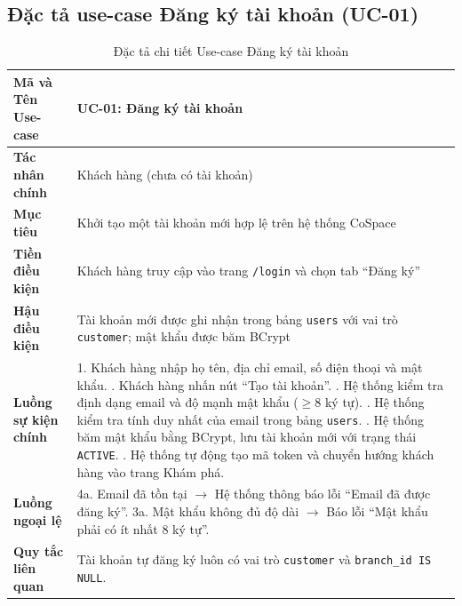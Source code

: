 \subsection{Đặc tả use-case Đăng ký tài khoản (UC-01)}
\begin{table}[H]
\centering
\small
\renewcommand{\arraystretch}{1.2}
\begin{tabular}{|p{3.6cm}|p{10.4cm}|}
\hline
\textbf{Mã và Tên Use-case} & \textbf{UC-01: Đăng ký tài khoản} \\ \hline
\textbf{Tác nhân chính} & Khách hàng (chưa có tài khoản) \\ \hline
\textbf{Mục tiêu} & Khởi tạo một tài khoản mới hợp lệ trên hệ thống CoSpace \\ \hline
\textbf{Tiền điều kiện} & Khách hàng truy cập vào trang \texttt{/login} và chọn tab ``Đăng ký'' \\ \hline
\textbf{Hậu điều kiện} & Tài khoản mới được ghi nhận trong bảng \texttt{users} với vai trò \texttt{customer}; mật khẩu được băm BCrypt \\ \hline
\textbf{Luồng sự kiện chính} & 
1. Khách hàng nhập họ tên, địa chỉ email, số điện thoại và mật khẩu. \newline
2. Khách hàng nhấn nút ``Tạo tài khoản''. \newline
3. Hệ thống kiểm tra định dạng email và độ mạnh mật khẩu ($\ge 8$ ký tự). \newline
4. Hệ thống kiểm tra tính duy nhất của email trong bảng \texttt{users}. \newline
5. Hệ thống băm mật khẩu bằng BCrypt, lưu tài khoản mới với trạng thái \texttt{ACTIVE}. \newline
6. Hệ thống tự động tạo mã token và chuyển hướng khách hàng vào trang Khám phá. \\ \hline
\textbf{Luồng ngoại lệ} & 
4a. Email đã tồn tại $\rightarrow$ Hệ thống thông báo lỗi ``Email đã được đăng ký''. \newline
3a. Mật khẩu không đủ độ dài $\rightarrow$ Báo lỗi ``Mật khẩu phải có ít nhất 8 ký tự''. \\ \hline
\textbf{Quy tắc liên quan} & Tài khoản tự đăng ký luôn có vai trò \texttt{customer} và \texttt{branch\_id IS NULL}. \\ \hline
\end{tabular}
\caption{Đặc tả chi tiết Use-case Đăng ký tài khoản}
\label{tab:uc_spec_01}
\end{table}

